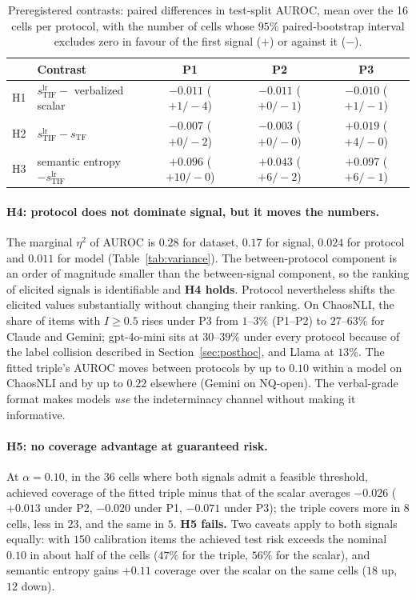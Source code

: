 \documentclass[11pt]{article}
\begin{document}
\begin{table}[t]
\centering
\caption{Preregistered contrasts: paired differences in test-split AUROC, mean over the 16
cells per protocol, with the number of cells whose $95\%$ paired-bootstrap interval excludes zero
in favour of the first signal ($+$) or against it ($-$).}
\label{tab:contrast}
\small
\begin{tabular}{llccc}
\toprule
 & Contrast & P1 & P2 & P3 \\
\midrule
H1 & $s_{\mathrm{TIF}}^{\mathrm{lr}} -$ verbalized scalar & $-0.011$ ($+1/-4$) & $-0.011$ ($+0/-1$) & $-0.010$ ($+1/-1$) \\
H2 & $s_{\mathrm{TIF}}^{\mathrm{lr}} - s_{\mathrm{TF}}$    & $-0.007$ ($+0/-2$) & $-0.003$ ($+0/-0$) & $+0.019$ ($+4/-0$) \\
H3 & semantic entropy $- s_{\mathrm{TIF}}^{\mathrm{lr}}$    & $+0.096$ ($+10/-0$) & $+0.043$ ($+6/-2$) & $+0.097$ ($+6/-1$) \\
\bottomrule
\end{tabular}
\end{table}

\paragraph{H4: protocol does not dominate signal, but it moves the numbers.} The marginal
$\eta^2$ of AUROC is $0.28$ for dataset, $0.17$ for signal, $0.024$ for protocol and $0.011$ for
model (Table~\ref{tab:variance}). The between-protocol component is an order of magnitude smaller
than the between-signal component, so the ranking of elicited signals is identifiable and
\textbf{H4 holds}. Protocol nevertheless shifts the elicited values substantially without
changing their ranking. On ChaosNLI, the share of items with $I\geq0.5$ rises under P3 from
$1$--$3\%$ (P1--P2) to $27$--$63\%$ for Claude and Gemini; gpt-4o-mini sits at $30$--$39\%$
under every protocol because of the label collision described in Section~\ref{sec:posthoc},
and Llama at $13\%$. The fitted triple's AUROC moves between protocols by up to $0.10$ within a
model on ChaosNLI and by up to $0.22$ elsewhere (Gemini on NQ-open). The verbal-grade format
makes models \emph{use} the indeterminacy channel without making it informative.

\paragraph{H5: no coverage advantage at guaranteed risk.} At $\alpha=0.10$, in the $36$ cells
where both signals admit a feasible threshold, achieved coverage of the fitted triple minus that
of the scalar averages $-0.026$ ($+0.013$ under P2, $-0.020$ under P1, $-0.071$ under P3); the
triple covers more in $8$ cells, less in $23$, and the same in $5$. \textbf{H5 fails.} Two
caveats apply to both signals equally: with $150$ calibration items the achieved test risk exceeds
the nominal $0.10$ in about half of the cells ($47\%$ for the triple, $56\%$ for the scalar), and
semantic entropy gains $+0.11$ coverage over the scalar on the same cells ($18$ up, $12$ down).
\end{document}

